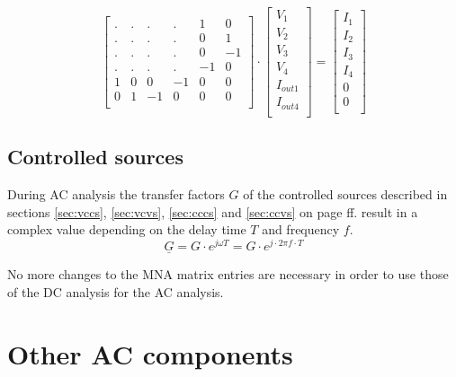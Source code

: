 \begin{equation}
\begin{bmatrix}
.&.&.&.& 1 & 0\\
.&.&.&.& 0 & 1\\
.&.&.&.& 0 &-1\\
.&.&.&.&-1 & 0\\
1 & 0 & 0 & -1 & 0 & 0\\
0 & 1 &-1 &  0 & 0 & 0\\
\end{bmatrix}
\cdot
\begin{bmatrix}
V_{1}\\
V_{2}\\
V_{3}\\
V_{4}\\
I_{out1}\\
I_{out4}\\
\end{bmatrix}
=
\begin{bmatrix}
I_{1}\\
I_{2}\\
I_{3}\\
I_{4}\\
0\\
0\\
\end{bmatrix}
\end{equation}


\subsection{Controlled sources}

During AC analysis the transfer factors $G$ of the controlled sources
described in sections \ref{sec:vccs}, \ref{sec:vcvs}, \ref{sec:cccs}
and \ref{sec:ccvs} on page \pageref{sec:vccs} ff. result in a complex
value depending on the delay time $T$ and frequency $f$.
\begin{equation}
\underline{G} = G\cdot e^{j\omega T} = G\cdot e^{j\cdot 2\pi f\cdot T}
\end{equation}

No more changes to the MNA matrix entries are necessary in order to
use those of the DC analysis for the AC analysis.

\section{Other AC components}

